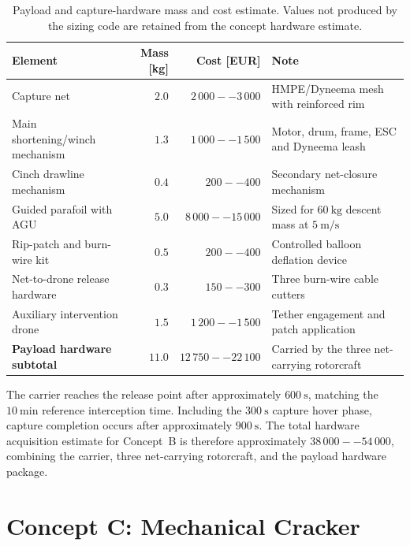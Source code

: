 \begin{table}[H]
\centering
\small
\caption{Payload and capture-hardware mass and cost estimate. Values not produced by the sizing code are retained from the concept hardware estimate.}
\label{tab:conceptB_payload_compact}
\setlength{\tabcolsep}{4pt}
\begin{tabularx}{\linewidth}{lrrX}
\hline
\textbf{Element} & \textbf{Mass [kg]} & \textbf{Cost [EUR]} & \textbf{Note} \\
\hline
Capture net & $2.0$ & $2\,000--3\,000$ & HMPE/Dyneema mesh with reinforced rim \\
Main shortening/winch mechanism & $1.3$ & $1\,000--1\,500$ & Motor, drum, frame, ESC and Dyneema leash \\
Cinch drawline mechanism & $0.4$ & $200--400$ & Secondary net-closure mechanism \\
Guided parafoil with AGU & $5.0$ & $8\,000--15\,000$ & Sized for $60~\mathrm{kg}$ descent mass at $5~\mathrm{m/s}$ \\
Rip-patch and burn-wire kit & $0.5$ & $200--400$ & Controlled balloon deflation device \\
Net-to-drone release hardware & $0.3$ & $150--300$ & Three burn-wire cable cutters \\
Auxiliary intervention drone & $1.5$ & $1\,200--1\,500$ & Tether engagement and patch application \\
\hline
\textbf{Payload hardware subtotal} & \textbf{$11.0$} & \textbf{$12\,750--22\,100$} & Carried by the three net-carrying rotorcraft \\
\hline
\end{tabularx}
\end{table}

The carrier reaches the release point after approximately $600~\mathrm{s}$, matching the $10~\mathrm{min}$ reference interception time. Including the $300~\mathrm{s}$ capture hover phase, capture completion occurs after approximately $900~\mathrm{s}$. The total hardware acquisition estimate for Concept~B is therefore approximately $38\,000--54\,000$, combining the carrier, three net-carrying rotorcraft, and the payload hardware package.




 

\section{Concept C: Mechanical Cracker}

